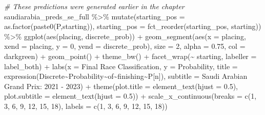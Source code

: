 \documentclass[
]{book}
\newenvironment{Shaded}{\begin{snugshade}}{\end{snugshade}}
\newcommand{\AttributeTok}[1]{\textcolor[rgb]{0.77,0.63,0.00}{#1}}
\newcommand{\CommentTok}[1]{\textcolor[rgb]{0.56,0.35,0.01}{\textit{#1}}}
\newcommand{\DecValTok}[1]{\textcolor[rgb]{0.00,0.00,0.81}{#1}}
\newcommand{\FloatTok}[1]{\textcolor[rgb]{0.00,0.00,0.81}{#1}}
\newcommand{\FunctionTok}[1]{\textcolor[rgb]{0.00,0.00,0.00}{#1}}
\newcommand{\NormalTok}[1]{#1}
\newcommand{\SpecialCharTok}[1]{\textcolor[rgb]{0.00,0.00,0.00}{#1}}
\newcommand{\StringTok}[1]{\textcolor[rgb]{0.31,0.60,0.02}{#1}}
\begin{document}
\begin{Shaded}
\begin{Highlighting}[]
\CommentTok{\# These predictions were generated earlier in the chapter}
\NormalTok{saudiarabia\_preds\_se\_full }\SpecialCharTok{\%\textgreater{}\%}
  \FunctionTok{mutate}\NormalTok{(}\AttributeTok{starting\_pos =} \FunctionTok{as.factor}\NormalTok{(}\FunctionTok{paste0}\NormalTok{(}\StringTok{\textquotesingle{}P\textquotesingle{}}\NormalTok{,starting)),}
         \AttributeTok{starting\_pos =} \FunctionTok{fct\_reorder}\NormalTok{(starting\_pos, starting)) }\SpecialCharTok{\%\textgreater{}\%}
  \FunctionTok{ggplot}\NormalTok{(}\FunctionTok{aes}\NormalTok{(placing, discrete\_prob)) }\SpecialCharTok{+}
  \FunctionTok{geom\_segment}\NormalTok{(}\FunctionTok{aes}\NormalTok{(}\AttributeTok{x =}\NormalTok{ placing, }\AttributeTok{xend =}\NormalTok{ placing, }\AttributeTok{y =} \DecValTok{0}\NormalTok{, }\AttributeTok{yend =}\NormalTok{ discrete\_prob),}
               \AttributeTok{size =} \DecValTok{2}\NormalTok{, }\AttributeTok{alpha =} \FloatTok{0.75}\NormalTok{, }\AttributeTok{col =} \StringTok{\textquotesingle{}darkgreen\textquotesingle{}}\NormalTok{) }\SpecialCharTok{+}
  \FunctionTok{geom\_point}\NormalTok{() }\SpecialCharTok{+}
  \FunctionTok{theme\_bw}\NormalTok{() }\SpecialCharTok{+}
  \FunctionTok{facet\_wrap}\NormalTok{(}\SpecialCharTok{\textasciitilde{}}\NormalTok{ starting, }\AttributeTok{labeller =}\NormalTok{ label\_both) }\SpecialCharTok{+}
  \FunctionTok{labs}\NormalTok{(}\AttributeTok{x =} \StringTok{\textquotesingle{}Final Race Classification\textquotesingle{}}\NormalTok{,}
       \AttributeTok{y =} \StringTok{\textquotesingle{}Probability\textquotesingle{}}\NormalTok{,}
       \AttributeTok{title =} \FunctionTok{expression}\NormalTok{(Discrete}\SpecialCharTok{\textasciitilde{}}\NormalTok{Probability}\SpecialCharTok{\textasciitilde{}}\NormalTok{of}\SpecialCharTok{\textasciitilde{}}\NormalTok{finishing}\SpecialCharTok{\textasciitilde{}}\NormalTok{P[n]),}
       \AttributeTok{subtitle =} \StringTok{\textquotesingle{}Saudi Arabian Grand Prix: 2021 {-} 2023\textquotesingle{}}\NormalTok{) }\SpecialCharTok{+}
  \FunctionTok{theme}\NormalTok{(}\AttributeTok{plot.title =} \FunctionTok{element\_text}\NormalTok{(}\AttributeTok{hjust =} \FloatTok{0.5}\NormalTok{),}
        \AttributeTok{plot.subtitle =} \FunctionTok{element\_text}\NormalTok{(}\AttributeTok{hjust =} \FloatTok{0.5}\NormalTok{)) }\SpecialCharTok{+}
  \FunctionTok{scale\_x\_continuous}\NormalTok{(}\AttributeTok{breaks =} \FunctionTok{c}\NormalTok{(}\DecValTok{1}\NormalTok{, }\DecValTok{3}\NormalTok{, }\DecValTok{6}\NormalTok{, }\DecValTok{9}\NormalTok{, }\DecValTok{12}\NormalTok{, }\DecValTok{15}\NormalTok{, }\DecValTok{18}\NormalTok{), }\AttributeTok{labels =} \FunctionTok{c}\NormalTok{(}\DecValTok{1}\NormalTok{, }\DecValTok{3}\NormalTok{, }\DecValTok{6}\NormalTok{, }\DecValTok{9}\NormalTok{, }\DecValTok{12}\NormalTok{, }\DecValTok{15}\NormalTok{, }\DecValTok{18}\NormalTok{))}
\end{Highlighting}
\end{Shaded}
\end{document}
